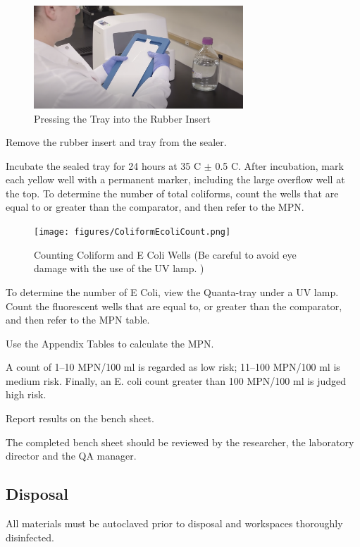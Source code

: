 \documentclass[12pt]{../SOP4_alpha}\usepackage[]{graphicx}\usepackage[]{xcolor}
\begin{document}
\begin{figure}[h]
\includegraphics[width=0.7\textwidth]{figures/RubberInsert.png}
\caption{Pressing the Tray into the Rubber Insert}
\end{figure}

\NP Remove the rubber insert and tray from the sealer.

\NP Incubate the sealed tray for 24 hours at 35 \degree C $\pm$ 0.5 \degree C.
\NP After incubation, mark each yellow well with a permanent marker, including the large overflow well at the top. To determine the number of total coliforms, count the wells that are equal to or greater than the comparator, and then refer to the MPN.

\begin{figure}[h]
\centering
\texttt{[image: figures/ColiformEcoliCount.png]}
\caption{Counting Coliform and E Coli Wells (Be careful to avoid eye damage with  the use of the UV lamp.  )}
\end{figure}

\NP To determine the number of E Coli, view the Quanta-tray under a UV lamp. Count the fluorescent wells that are equal to, or greater than the comparator, and then refer to the MPN table.


\NP Use the Appendix Tables to calculate the MPN. 

\NP A count of 1–10 MPN/100 ml is regarded as low risk; 11–100 MPN/100 ml is medium risk. Finally, an E. coli count greater than 100 MPN/100 ml is judged high risk.


\NP Report results on the bench sheet.

\NP The completed bench sheet should be reviewed by the researcher, the
laboratory director and the QA manager. 

\subsection{Disposal}


\NP All materials must be autoclaved prior to disposal and workspaces
thoroughly disinfected.
\end{document}
